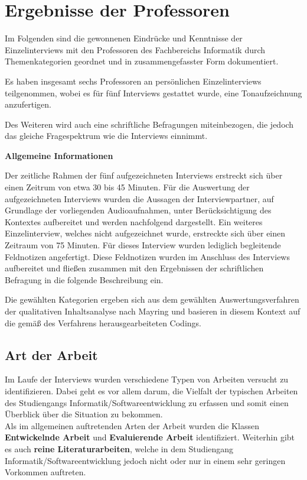 \documentclass{scrreprt}
\begin{document}
\section{Ergebnisse der Professoren}
\par Im Folgenden sind die gewonnenen Eindrücke und Kenntnisse der Einzelinterviews mit den Professoren des Fachbereichs Informatik durch Themenkategorien geordnet und in zusammengefasster Form dokumentiert.
\par Es haben insgesamt sechs Professoren an persönlichen Einzelinterviews teilgenommen, wobei es für fünf Interviews gestattet wurde, eine Tonaufzeichnung anzufertigen.
\par\medskip Des Weiteren wird auch eine schriftliche Befragungen miteinbezogen, die jedoch das gleiche Fragespektrum wie die Interviews einnimmt.
\par\bigskip \textbf{Allgemeine Informationen}
\par Der zeitliche Rahmen der fünf aufgezeichneten Interviews erstreckt sich über einen Zeitrum von etwa 30 bis 45 Minuten. Für die Auswertung der aufgezeichneten Interviews wurden die Aussagen der Interviewpartner, auf Grundlage der vorliegenden Audioaufnahmen, unter Berücksichtigung des Kontextes aufbereitet und werden nachfolgend dargestellt. Ein weiteres Einzelinterview, welches nicht aufgezeichnet wurde, erstreckte sich über einen Zeitraum von 75 Minuten. Für dieses Interview wurden lediglich begleitende Feldnotizen angefertigt. Diese Feldnotizen wurden im Anschluss des Interviews aufbereitet und fließen zusammen mit den Ergebnissen der schriftlichen Befragung in die folgende Beschreibung ein.
\par\medskip Die gewählten Kategorien ergeben sich aus dem gewählten Auswertungsverfahren der qualitativen Inhaltsanalyse nach Mayring\citep{Mayring2015} und basieren in diesem Kontext auf die gemäß des Verfahrens herausgearbeiteten Codings.

\newpage
\subsection{Art der Arbeit}
\par Im Laufe der Interviews wurden verschiedene Typen von Arbeiten versucht zu identifizieren. Dabei geht es vor allem darum, die Vielfalt der typischen Arbeiten des Studiengangs Informatik/Softwareentwicklung zu erfassen und somit einen Überblick über die Situation zu bekommen.\\
Als im allgemeinen auftretenden Arten der Arbeit wurden die Klassen \textbf{Entwickelnde Arbeit}  und \textbf{Evaluierende Arbeit} identifiziert. Weiterhin gibt es auch \textbf{reine Literaturarbeiten}, welche in dem Studiengang Informatik/Softwareentwicklung jedoch nicht oder nur in einem sehr geringen Vorkommen auftreten.
\end{document}

